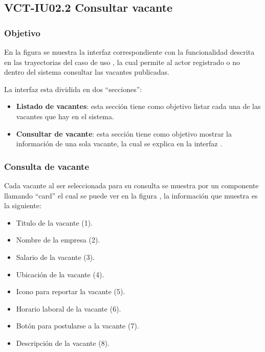 \clearpage
\subsection{VCT-IU02.2 Consultar vacante}

\subsubsection{Objetivo}
En la figura  se muestra la interfaz correspondiente con la funcionalidad descrita en las
trayectorias del caso de uso  , la cual permite al actor registrado o no dentro del sistema consultar 
las vacantes publicadas.

La interfaz esta dividida en dos ``secciones'':
\begin{itemize}
   \item \textbf{Listado de vacantes}: esta sección tiene como objetivo listar cada una de las vacantes que hay en el sistema.
   \item \textbf{Consultar de vacante}: esta sección tiene como objetivo mostrar la información de una sola vacante, la cual se explica en 
   la interfaz .
\end{itemize}


\subsubsection{Consulta de vacante}
Cada vacante al ser seleccionada para su consulta se muestra por un componente llamando ``card'' el cual se puede ver en la figura , la información que 
muestra es la siguiente: 
\begin{itemize}
   \item Titulo de la vacante (1).
   \item Nombre de la empresa (2).
   \item Salario de la vacante (3).
   \item Ubicación de la vacante (4).
   \item Icono para reportar la vacante (5).
   \item Horario laboral de la vacante (6).
   \item Botón para postularse a la vacante (7).
   \item Descripción de la vacante (8).
\end{itemize}




\clearpage
